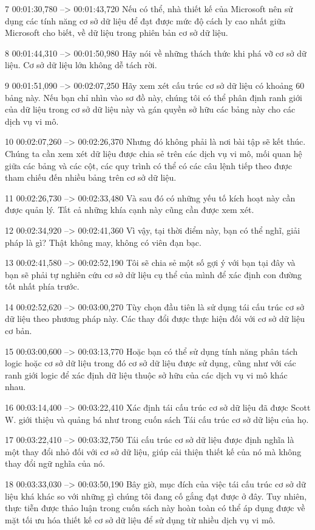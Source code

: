 7
00:01:30,780 --> 00:01:43,720
Nếu có thể, nhà thiết kế của Microsoft nên sử dụng các tính năng cơ sở dữ liệu để đạt được mức độ cách ly cao nhất giữa Microsoft cho biết, về dữ liệu trong phiên bản cơ sở dữ liệu.

8
00:01:44,310 --> 00:01:50,980
Hãy nói về những thách thức khi phá vỡ cơ sở dữ liệu.  Cơ sở dữ liệu lớn không dễ tách rời.

9
00:01:51,090 --> 00:02:07,250
Hãy xem xét cấu trúc cơ sở dữ liệu có khoảng 60 bảng này.  Nếu bạn chỉ nhìn vào sơ đồ này, chúng tôi có thể phân định ranh giới của dữ liệu trong cơ sở dữ liệu này và gán quyền sở hữu các bảng này cho các dịch vụ vi mô.

10
00:02:07,260 --> 00:02:26,370
Nhưng đó không phải là nơi bài tập sẽ kết thúc.  Chúng ta cần xem xét dữ liệu được chia sẻ trên các dịch vụ vi mô, mối quan hệ giữa các bảng và các cột, các quy trình có thể có các câu lệnh tiếp theo được tham chiếu đến nhiều bảng trên cơ sở dữ liệu.

11
00:02:26,730 --> 00:02:33,480
Và sau đó có những yếu tố kích hoạt này cần được quản lý.  Tất cả những khía cạnh này cũng cần được xem xét.

12
00:02:34,920 --> 00:02:41,360
Vì vậy, tại thời điểm này, bạn có thể nghĩ, giải pháp là gì?  Thật không may, không có viên đạn bạc.

13
00:02:41,580 --> 00:02:52,190
Tôi sẽ chia sẻ một số gợi ý với bạn tại đây và bạn sẽ phải tự nghiên cứu cơ sở dữ liệu cụ thể của mình để xác định con đường tốt nhất phía trước.

14
00:02:52,620 --> 00:03:00,270
Tùy chọn đầu tiên là sử dụng tái cấu trúc cơ sở dữ liệu theo phương pháp này.  Các thay đổi được thực hiện đối với cơ sở dữ liệu cơ bản.

15
00:03:00,600 --> 00:03:13,770
Hoặc bạn có thể sử dụng tính năng phân tách logic hoặc cơ sở dữ liệu trong đó cơ sở dữ liệu được sử dụng, cũng như với các ranh giới logic để xác định dữ liệu thuộc sở hữu của các dịch vụ vi mô khác nhau.

16
00:03:14,400 --> 00:03:22,410
Xác định tái cấu trúc cơ sở dữ liệu đã được Scott W. giới thiệu và quảng bá như trong cuốn sách Tái cấu trúc cơ sở dữ liệu của họ.

17
00:03:22,410 --> 00:03:32,750
Tái cấu trúc cơ sở dữ liệu được định nghĩa là một thay đổi nhỏ đối với cơ sở dữ liệu, giúp cải thiện thiết kế của nó mà không thay đổi ngữ nghĩa của nó.

18
00:03:33,030 --> 00:03:50,190
Bây giờ, mục đích của việc tái cấu trúc cơ sở dữ liệu khá khác so với những gì chúng tôi đang cố gắng đạt được ở đây.  Tuy nhiên, thực tiễn được thảo luận trong cuốn sách này hoàn toàn có thể áp dụng được về mặt tối ưu hóa thiết kế cơ sở dữ liệu để sử dụng từ nhiều dịch vụ vi mô.


